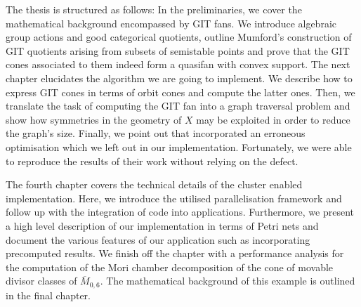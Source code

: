 The thesis is structured as follows: In the preliminaries, we cover the mathematical background encompassed by GIT fans. We introduce algebraic group actions and good categorical quotients, outline Mumford's construction of GIT quotients arising from subsets of semistable points and prove that the GIT cones associated to them indeed form a quasifan with convex support. The next chapter elucidates the algorithm we are going to implement. We describe how to express GIT cones in terms of orbit cones and compute the latter ones. Then, we translate the task of computing the GIT fan into a graph traversal problem and show how symmetries in the geometry of $X$ may be exploited in order to reduce the graph's size. Finally, we point out that  \citeauthor{gitfan_symmetry} incorporated an erroneous optimisation which we left out in our implementation. Fortunately, we were able to reproduce the results of their work without relying on the defect.

The fourth chapter covers the technical details of the cluster enabled implementation. Here, we introduce the utilised parallelisation framework \gpispace{} and follow up with the integration of \singular{} code into \gpispace{} applications. Furthermore, we present a high level description of our implementation in terms of Petri nets and document the various features of our application such as incorporating precomputed results. We finish off the chapter with a performance analysis for the computation of the Mori chamber decomposition of the cone of movable divisor classes of $\overline{M}_{0,6}$. The mathematical background of this example is outlined in the final chapter.
